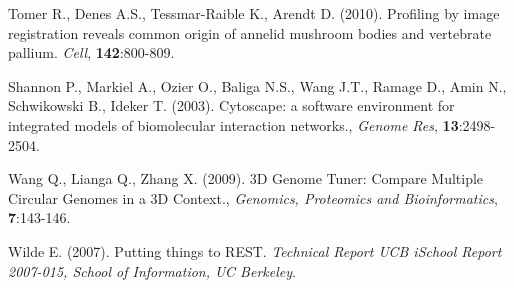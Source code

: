 \documentclass{bioinfo}
\begin{document}
\begin{thebibliography}{}
 Tomer R., Denes A.S., Tessmar-Raible K., Arendt D. (2010). Profiling by image registration reveals common origin of annelid mushroom bodies and vertebrate pallium. {\it{Cell}}, {\bf{142}}:800-809. 

 Shannon P., Markiel A., Ozier O., Baliga N.S., Wang J.T., Ramage D., Amin N., Schwikowski B., Ideker T. (2003). Cytoscape: a software environment for integrated models of biomolecular interaction networks., {\it Genome Res}, {\bf{13}}:2498-2504.

 Wang Q., Lianga Q., Zhang X. (2009). 3D Genome Tuner: Compare Multiple Circular Genomes in a 3D Context., {\it Genomics, Proteomics and Bioinformatics}, {\bf{7}}:143-146.

 Wilde E. (2007). Putting things to REST. {\it Technical Report UCB iSchool Report 2007-015, School of Information, UC Berkeley}.

\end{thebibliography}
\end{document}
